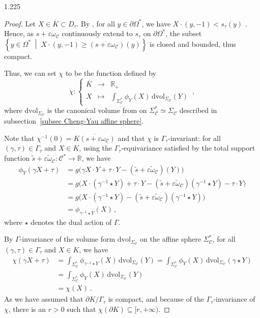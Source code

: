 \documentclass[reqno, a4paper]{amsart}
\numberwithin{equation}{section}
\numberwithin{figure}{section}
\theoremstyle{definition}
\theoremstyle{remark}
\newcommand{\R}{\mathbb{R}} %
\newcommand{\dif}{\mathrm{d}} %
\newcommand{\C}{\mathcal{C}} %
\renewcommand{\S}{\Sigma_\C} %
\newcommand{\dvol}{\dif \mathrm{vol}} %
\newcommand{\st}{\; \middle\vert \;} %
\newcommand{\namelessfunction}[4]{ \left\lbrace \begin{matrix}
{#1} &\longrightarrow& {#2}\\
{#3} & \longmapsto & {#4}
\end{matrix} \right. }
\newcommand{\function}[5]{{#1}: \namelessfunction{#2}{#3}{#4}{#5}}
\newcommand{\bp}[1]{{\bigl( {#1} \bigr)}} %
\begin{document}
\begin{spacing}{1.225}
\begin{proof}
Let $X \in \overline{K} \subset D_\tau$. By \cite[Proposition~4.22]{Ablondi_25}, for all $y \in \partial\Omega^*$, we have $ X\cdot(y,-1)< s_\tau(y)$ . Hence, as $s+\varepsilon \omega_\C$ continuously extend to $s_\tau$ on $\partial \Omega^*$, the subset $\left\lbrace y \in \Omega^* \st X\cdot(y,-1)\geq(s+\varepsilon\omega_\C)(y) \right\rbrace$ is closed and bounded, thus compact.

Thus, we can set $\chi$ to be the function defined by
\begin{equation*}
\function{\chi}{\overline{K}}{\R_+}{X}{\int_{\S^*}\phi_Y(X) \, \dvol_{\S}(Y)} \, ,
\end{equation*}
where $\dvol_{\S}$ is the canonical volume from on $\S^* \simeq\S$ described in subsection~\ref{subsec Cheng-Yau affine sphere}.

Note that $\chi^{-1}(0) = \overline{K(s+\varepsilon \omega_\C)}$ and that $\chi$ is $\Gamma_\tau$-invariant: for all $(\gamma,\tau) \in \Gamma_\tau$ and $X \in K$, using the $\Gamma_\tau$-equivariance satisfied by the total support function $\tilde s+\varepsilon\tilde\omega_\C : \C^* \to \R$, we have
\begin{align*}
 \phi_Y(\gamma X+\tau) & = g\bp{\gamma X\cdot Y + \tau \cdot Y-(\tilde s+\varepsilon\tilde\omega_\C)(Y)} \\
 & = g\bp{ X\cdot(\gamma^{-1} \star Y) + \tau \cdot Y-(\tilde s+\varepsilon\tilde\omega_\C)(\gamma^{-1} \star Y) - \tau \cdot Y} \\
 & = g\bp{ X\cdot(\gamma^{-1} \star Y)-(\tilde s+\varepsilon\tilde\omega_\C)(\gamma^{-1} \star Y)} \\
 & = \phi_{\gamma^{-1} \star Y}(X) \, ,
\end{align*}
where $\star$ denotes the dual action of $\Gamma$. 

By $\Gamma$-invariance of the volume form $\dvol_{\S}$ on the affine sphere $\S^*$, for all $(\gamma,\tau) \in \Gamma_\tau$ and $X \in K$, we have
\begin{align*}
 \chi(\gamma X+\tau) & = \int_{\S^*}\phi_{\gamma^{-1} \star Y}(X) \, \dvol_{\S}(Y) = \int_{\S^*}\phi_{Y}(X) \, \dvol_{\S}(\gamma \star Y) \\
 & =\int_{\S^*}\phi_{Y}(X) \, \dvol_{\S}(Y) \\
 & = \chi(X) \, . 
\end{align*}
As we have assumed that $\partial K / \Gamma_\tau$ is compact, and because of the $\Gamma_\tau$-invariance of $\chi$, there is an $r>0$ such that $\chi(\partial K) \subseteq [r,+\infty)$. 


\end{proof}
\end{spacing}
\end{document}
